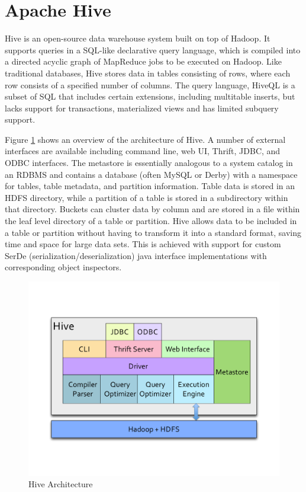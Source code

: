 
\section{Apache Hive}

Hive is an open-source data warehouse system built on top of Hadoop. It supports queries in a  SQL-like declarative query language, which is compiled into a directed acyclic graph of MapReduce jobs to be executed on Hadoop. Like traditional databases, Hive stores data in tables consisting of rows, where each row consists of a specified number of columns. The query language, HiveQL is a subset of SQL that includes certain extensions, including multitable inserts, but lacks support for transactions, materialized views and has limited subquery support. 

Figure \ref{fig:hivearch} shows an overview of the architecture of Hive. A number of external interfaces are available including command line, web UI, Thrift, JDBC, and ODBC interfaces. The metastore is essentially analogous to a system catalog in an RDBMS and contains a database (often MySQL or Derby) with a namespace for tables, table metadata, and partition information. Table data is stored in an HDFS directory, while a partition of a table is stored in a subdirectory within that directory. Buckets can cluster data by column and are stored in a file within the leaf level directory of a table or partition. Hive allows data to be included in a table or partition without having to transform it into a standard format, saving time and space for large data sets. This is achieved with support for custom SerDe (serialization/deserialization) java interface implementations with corresponding object inspectors. 

\begin{figure}[t]
	\centering
	\includegraphics[width=\linewidth]{files/architecture-hive.pdf}
	\caption{Hive Architecture}
	\label{fig:hivearch}
\end{figure}


